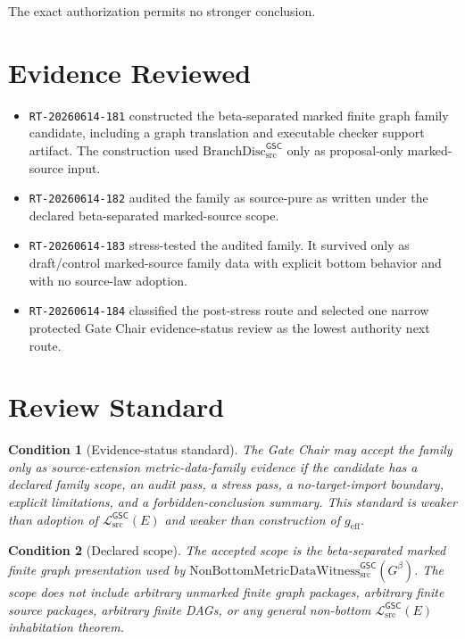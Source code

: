 \documentclass[11pt]{article}
\newcommand{\BranchDisc}{\mathrm{BranchDisc}_{\mathrm{src}}^{\mathsf{GSC}}}
\newcommand{\Witness}{\mathrm{NonBottomMetricDataWitness}_{\mathrm{src}}^{\mathsf{GSC}}}
\newcommand{\Gbeta}{G^{\beta}}
\newcommand{\MetricData}{\mathcal{L}_{\mathrm{src}}^{\mathsf{GSC}}}
\newcommand{\geff}{g_{\mathrm{eff}}}
\newtheorem{condition}{Condition}
\begin{document}
The exact authorization permits no stronger conclusion.

\section{Evidence Reviewed}

\begin{itemize}[leftmargin=*]
  \item \texttt{RT-20260614-181} constructed the beta-separated marked finite
  graph family candidate, including a graph translation and executable
  checker support artifact. The construction used \(\BranchDisc\) only as
  proposal-only marked-source input.
  \item \texttt{RT-20260614-182} audited the family as source-pure as written
  under the declared beta-separated marked-source scope.
  \item \texttt{RT-20260614-183} stress-tested the audited family. It survived
  only as draft/control marked-source family data with explicit bottom
  behavior and with no source-law adoption.
  \item \texttt{RT-20260614-184} classified the post-stress route and selected
  one narrow protected Gate Chair evidence-status review as the lowest
  authority next route.
\end{itemize}

\section{Review Standard}

\begin{condition}[Evidence-status standard]
The Gate Chair may accept the family only as source-extension
metric-data-family evidence if the candidate has a declared family scope, an
audit pass, a stress pass, a no-target-import boundary, explicit limitations,
and a forbidden-conclusion summary. This standard is weaker than adoption of
\(\MetricData(E)\) and weaker than construction of \(\geff\).
\end{condition}

\begin{condition}[Declared scope]
The accepted scope is the beta-separated marked finite graph presentation
used by \(\Witness(\Gbeta)\). The scope does not include arbitrary unmarked
finite graph packages, arbitrary finite source packages, arbitrary finite
DAGs, or any general non-bottom \(\MetricData(E)\) inhabitation theorem.
\end{condition}
\end{document}
